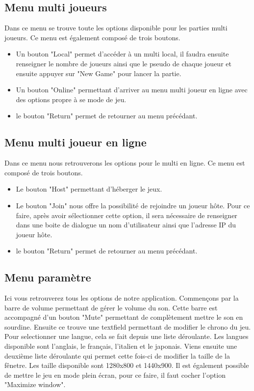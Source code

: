 \subsection{Menu multi joueurs}
Dans ce menu se trouve toute les options disponible pour les parties multi joueurs. Ce menu est également 
composé de trois boutons.
\begin{itemize}
	\item Un bouton "Local" permet d'accéder à un multi local, il faudra ensuite renseigner le nombre de joueurs
		ainsi que le pseudo de chaque joueur et ensuite appuyer sur "New Game" pour lancer la partie.
	\item Un bouton "Online" permettant d'arriver au menu multi joueur en ligne avec des options propre à se 
		mode de jeu.
	\item le bouton "Return" permet de retourner au menu précédant.
\end{itemize} 

\subsection{Menu multi joueur en ligne}
Dans ce menu nous retrouverons les options pour le multi en ligne. Ce menu est composé de trois boutons.
\begin{itemize}
	\item Le bouton "Host" permettant d'héberger le jeux.
	\item Le bouton "Join" nous offre la possibilité de rejoindre un joueur hôte. Pour ce faire, après avoir 
		sélectionner cette option, il sera nécessaire de renseigner dans une boite de dialogue  un nom 
		d'utilisateur ainsi que l'adresse IP du joueur hôte.
	\item le bouton "Return" permet de retourner au menu précédant.
\end{itemize}

\subsection{Menu paramètre}
Ici vous retrouverez tous les options de notre application. Commençons par la barre de volume permettant de gérer 
le volume du son. Cette barre est accompagné d'un bouton "Mute" permettant de complètement mettre le son en 
sourdine. Ensuite ce trouve une textfield permettant de modifier le chrono du jeu. Pour selectionner une langue,
cela se fait depuis une liste déroulante. Les langues disponible sont l'anglais, le français, l'italien et le 
japonais. Viens ensuite une deuxième liste déroulante qui permet cette fois-ci de modifier la taille de la fênetre. Les taille disponible sont 1280x800 et 1440x900. Il est également possible de mettre le jeu en mode plein écran, pour ce faire, il faut cocher l'option "Maximize window".


